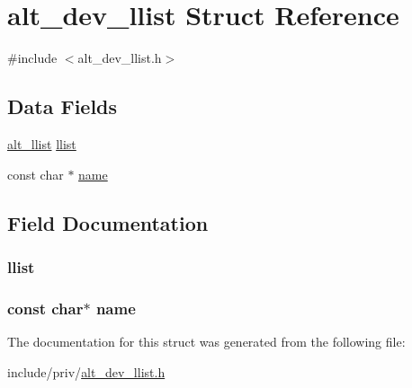 \hypertarget{structalt__dev__llist}{\section{alt\-\_\-dev\-\_\-llist \-Struct \-Reference}
\label{structalt__dev__llist}
}


{\ttfamily \#include $<$alt\-\_\-dev\-\_\-llist.\-h$>$}

\subsection*{\-Data \-Fields}
\begin{DoxyCompactItemize}
\item 
\hyperlink{alt__llist_8h_a94b50b44e6bd512a432af0b840d49aa4}{alt\-\_\-llist} \hyperlink{structalt__dev__llist_a135bc0be285afc59289210771ad9c136}{llist}
\item 
const char $\ast$ \hyperlink{structalt__dev__llist_a8f8f80d37794cde9472343e4487ba3eb}{name}
\end{DoxyCompactItemize}


\subsection{\-Field \-Documentation}
\hypertarget{structalt__dev__llist_a135bc0be285afc59289210771ad9c136}{
\subsubsection[{llist}]{ {\bf llist}}}\label{structalt__dev__llist_a135bc0be285afc59289210771ad9c136}
\hypertarget{structalt__dev__llist_a8f8f80d37794cde9472343e4487ba3eb}{
\subsubsection[{name}]{\setlength{\rightskip}{0pt plus 5cm}const char$\ast$ {\bf name}}}\label{structalt__dev__llist_a8f8f80d37794cde9472343e4487ba3eb}


\-The documentation for this struct was generated from the following file\-:\begin{DoxyCompactItemize}
\item 
include/priv/\hyperlink{alt__dev__llist_8h}{alt\-\_\-dev\-\_\-llist.\-h}\end{DoxyCompactItemize}

